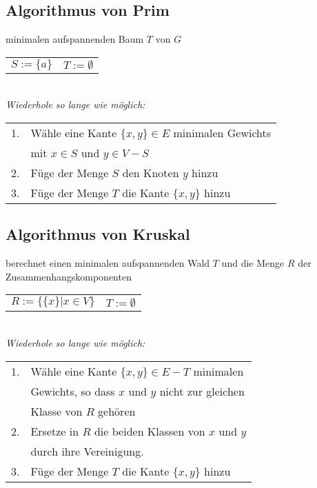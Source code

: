 \subsection{Algorithmus von Prim}
minimalen aufspannenden Baum $T$ von $G$ \\

\begin{tabular}{@{}ll}
    $S := \{ a \} $ & $ T := \emptyset $ \\
\end{tabular}\\

\textit{Wiederhole so lange wie möglich:}\\
\begin{tabular}{@{}ll}
    1. & Wähle eine Kante $\{x, y\} \in E$ minimalen Gewichts \\ 
    & mit $x \in S$ und $y \in V - S$ \\
    2. & Füge der Menge $S$ den Knoten $y$ hinzu \\
    3. & Füge der Menge $T$ die Kante $\{x, y\}$ hinzu \\
\end{tabular}

\subsection{Algorithmus von Kruskal}
berechnet einen minimalen aufspannenden
Wald $T$ und die Menge $R$ der Zusammenhangskomponenten

\begin{tabular}{@{}ll}
    $R := \{ \{x\} | x \in V \} $ & $ T := \emptyset $ \\
\end{tabular}\\

\textit{Wiederhole so lange wie möglich:}\\
\begin{tabular}{@{}ll}
    1. & Wähle eine Kante $\{x, y\} \in E - T$ minimalen \\ 
    & Gewichts, so dass $x$ und $y$ nicht zur gleichen \\
    & Klasse von $R$ gehören \\
    2. & Ersetze in $R$ die beiden Klassen von $x$ und $y$ \\
    & durch ihre Vereinigung.\\
    3. & Füge der Menge $T$ die Kante $\{x, y\}$ hinzu\\
\end{tabular}

